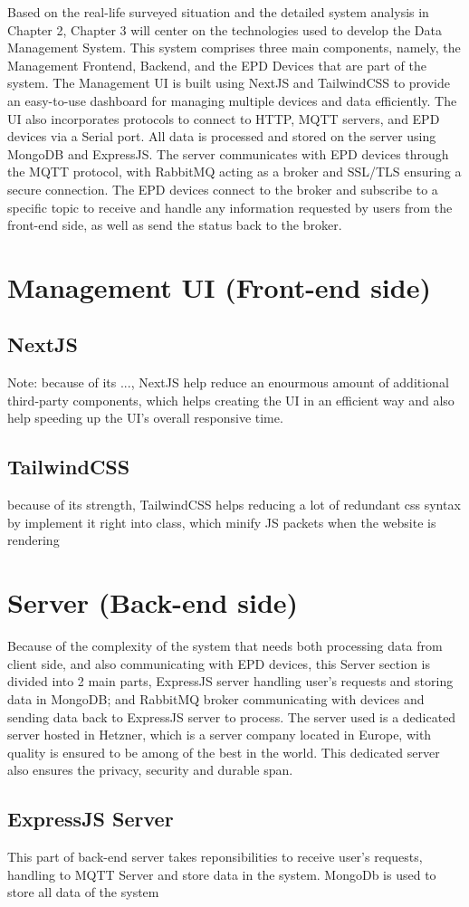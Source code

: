 \documentclass[../Main.tex]{subfiles}
\begin{document}
Based on the real-life surveyed situation and the detailed system analysis in Chapter 2, Chapter 3 will center on the technologies used to develop the Data Management System. This system comprises three main components, namely, the Management Frontend, Backend, and the EPD Devices that are part of the system. The Management UI is built using NextJS and TailwindCSS to provide an easy-to-use dashboard for managing multiple devices and data efficiently. The UI also incorporates protocols to connect to HTTP, MQTT servers, and EPD devices via a Serial port. All data is processed and stored on the server using MongoDB and ExpressJS. The server communicates with EPD devices through the MQTT protocol, with RabbitMQ acting as a broker and SSL/TLS ensuring a secure connection. The EPD devices connect to the broker and subscribe to a specific topic to receive and handle any information requested by users from the front-end side, as well as send the status back to the broker.

\section{Management UI (Front-end side)}
\subsection{NextJS}

Note: because of its ..., NextJS help reduce an enourmous amount of additional third-party components, which helps creating the UI in an efficient way and also help speeding up the UI's overall responsive time.
\subsection{TailwindCSS}

because of its strength, TailwindCSS helps reducing a lot of redundant css syntax by implement it right into class, which minify JS packets when the website is rendering

\section{Server (Back-end side)}
Because of the complexity of the system that needs both processing data from client side, and also communicating with EPD devices, this Server section is divided into 2 main parts, ExpressJS server handling user's requests and storing data in MongoDB; and RabbitMQ broker communicating with devices and sending data back to ExpressJS server to process. The server used is a dedicated server hosted in Hetzner, which is a server company located in Europe, with quality is ensured to be among of the best in the world. This dedicated server also ensures the privacy, security and durable span.

\subsection{ExpressJS Server}
This part of back-end server takes reponsibilities to receive user's requests, handling to MQTT Server and store data in the system. MongoDb is used to store all data of the system
\end{document}
